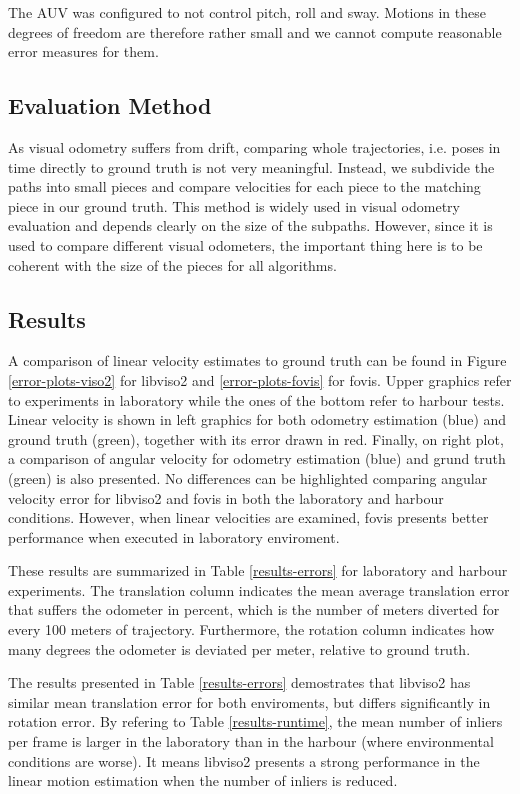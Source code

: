 \documentclass[conference]{IEEEtran}
\begin{document}
The AUV was configured to not control pitch, roll and sway. Motions in these degrees of freedom are therefore rather small and we cannot compute reasonable error measures for them.

\subsection{Evaluation Method
  \label{evaluation-method}
}

As visual odometry suffers from drift, comparing whole trajectories, i.e. poses in time directly to ground truth is not very meaningful. Instead, we subdivide the paths into small pieces and compare velocities for each piece to the matching piece in our ground truth. This method is widely used in visual odometry evaluation \cite{Kitti2013} and depends clearly on the size of the subpaths. However, since it is used to compare different visual odometers, the important thing here is to be coherent with the size of the pieces for all algorithms.

\subsection{Results
  \label{results}
}

A comparison of linear velocity estimates to ground truth can be found in Figure \ref{error-plots-viso2} for libviso2 and \ref{error-plots-fovis} for fovis. Upper graphics refer to experiments in laboratory while the ones of the bottom refer to harbour tests. Linear velocity is shown in left graphics for both odometry estimation (blue) and ground truth (green), together with its error drawn in red. Finally, on right plot, a comparison of angular velocity for odometry estimation (blue) and grund truth (green) is also presented. No differences can be highlighted comparing angular velocity error for libviso2 and fovis in both the laboratory and harbour conditions. However, when linear velocities are examined, fovis presents better performance when executed in laboratory enviroment.

These results are summarized in Table \ref{results-errors} for laboratory and harbour experiments. The translation column indicates the mean average translation error that suffers the odometer in percent, which is the number of meters diverted for every 100 meters of trajectory. Furthermore, the rotation column indicates how many degrees the odometer is deviated per meter, relative to ground truth.

The results presented in Table \ref{results-errors} demostrates that libviso2 has similar mean translation error for both enviroments, but differs significantly in rotation error. By refering to Table \ref{results-runtime}, the mean number of inliers per frame is larger in the laboratory than in the harbour (where environmental conditions are worse). It means libviso2 presents a strong performance in the linear motion estimation when the number of inliers is reduced.
\end{document}
